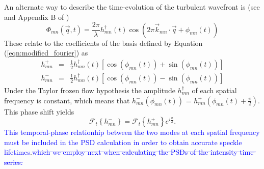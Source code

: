 \documentclass[10pt,preprint]{aastex631}
\newcommand{\jrmadd}[1]{\textcolor{blue}{#1}}
\newcommand{\jrmrmv}[1]{\textcolor{blue}{\sout{#1}}}
\begin{document}
An alternate way to describe the time-evolution of the turbulent wavefront is (see \citet{2005ApJ...629..592G} and Appendix B of \citet{2018JATIS...4a9001M})
\begin{equation}
\Phi_{mn}(\vec{q},t) = \frac{2\pi}{\lambda} h_{mn}^\dagger(t) \cos \left( 2\pi \vec{k}_{mn} \cdot \vec{q} + \phi_{mn}(t) \right)
\end{equation}
These relate to the coefficients of the basis defined by Equation (\ref{eqn:modified_fourier}) as
\begin{eqnarray}
h_{mn}^+ &=& \frac{1}{2} h_{mn}^\dagger(t) \left[ \cos(\phi_{mn}(t)) + \sin(\phi_{mn}(t))\right] \\
h_{mn}^- &=& \frac{1}{2} h_{mn}^\dagger(t) \left[ \cos(\phi_{mn}(t)) - \sin(\phi_{mn}(t))\right] \nonumber
\end{eqnarray}
Under the Taylor frozen flow hypothesis the amplitude $h_{mn}^\dagger$ of each spatial frequency is constant, which means that $h_{mn}^-(\phi_{mn}(t))$ = $h_{mn}^+(\phi_{mn}(t) + \frac{\pi}{2})$.  This phase shift yields
\begin{equation}
\mathcal{F}_t\left\{h_{mn}^-\right\} = \mathcal{F}_t\left\{h_{mn}^+\right\} e^{i\frac{\pi}{2}}.
\end{equation}
\jrmadd{This temporal-phase relationhip between the two modes at each spatial frequency must be included in the PSD calculation in order to obtain accurate speckle lifetimes}.\jrmrmv{which we employ next when calculating the PSDs of the intensity time-series.}
\end{document}
